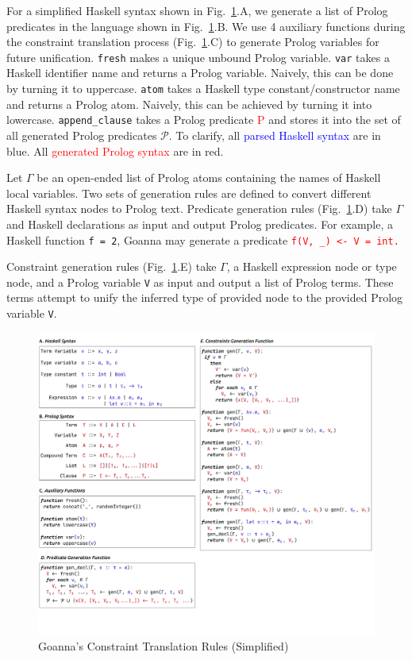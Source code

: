 \documentclass[pdflatex,lineno,sn-nature,Numbered]{sn-jnl}%
\begin{document}
For a simplified Haskell syntax shown in Fig.~\ref{fig:translation}.A, we generate a list of Prolog predicates in the language shown in Fig.~\ref{fig:translation}.B. We use 4 auxiliary functions during the constraint translation process (Fig.~\ref{fig:translation}.C) to generate Prolog variables for future unification. \texttt{fresh} makes a unique unbound Prolog variable. \texttt{var} takes a Haskell identifier name and returns a Prolog variable. Naively, this can be done by turning it to uppercase. \texttt{atom} takes a Haskell type constant/constructor name and returns a Prolog atom. Naively, this can be achieved by turning it into lowercase. \texttt{append\_clause} takes a Prolog predicate \textcolor{red}{P} and stores it into the set of all generated Prolog predicates $\mathcal{P}$. To clarify, all \textcolor{blue}{parsed Haskell syntax} are in blue. All \textcolor{red}{generated Prolog syntax} are in red. 
    
    Let $\Gamma$ be an open-ended list of Prolog atoms containing the names of Haskell local variables. Two sets of generation rules are defined to convert different Haskell syntax nodes to Prolog text. Predicate generation rules (Fig.~\ref{fig:translation}.D) take $\Gamma$ and Haskell declarations as input and output Prolog predicates. For example, a Haskell function \texttt{f = 2}, Goanna may generate a predicate \texttt{\textcolor{red}{f(V, \_) <- V = int.}}
    
    Constraint generation rules (Fig.~\ref{fig:translation}.E) take $\Gamma$, a Haskell expression node or type node, and a Prolog variable \texttt{V} as input and output a list of Prolog terms. These terms attempt to unify the inferred type of provided node to the provided Prolog variable \texttt{V}.
    
    \begin{figure}[ht!]
        \centering
        \includegraphics[width=\linewidth,trim={0 6cm 0 0},clip]{images/Generation}
        \caption{Goanna's Constraint Translation Rules (Simplified)} 
        \label{fig:translation}
    \end{figure}
    
\end{document}
